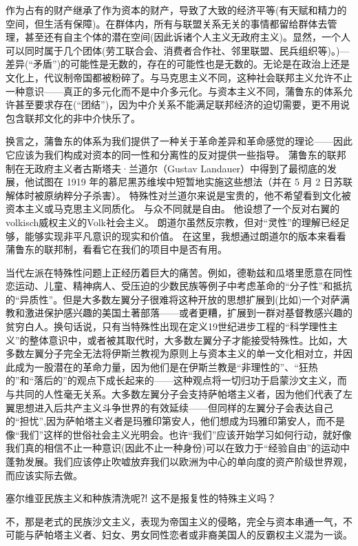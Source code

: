 \documentclass[DIV=12,%
               BCOR=0mm,%
               headinclude=false,%
               footinclude=false,open=any,%
               fontsize=10pt,%
               oneside,%
               paper=210mm:11in]%
               {scrbook}
\begin{document}
作为占有的财产继承了作为资本的财产，导致了大致的经济平等(有天赋和精力的空间，但生活有保障)。在群体内，所有与联盟关系无关的事情都留给群体去管理，甚至还有自主个体的潜在空间(因此诉诸个人主义无政府主义)。显然，一个人可以同时属于几个团体(劳工联合会、消费者合作社、邻里联盟、民兵组织等)。)—差异(“矛盾”)的可能性是无数的，存在的可能性也是无数的。无论是在政治上还是文化上，代议制帝国都被粉碎了。与马克思主义不同，这种社会联邦主义允许不止一种意识——真正的多元化而不是中介多元化。与资本主义不同，蒲鲁东的体系允许甚至要求存在(“团结”)，因为中介关系不能满足联邦经济的迫切需要，更不用说包含联邦文化的非中介快乐了。


换言之，蒲鲁东的体系为我们提供了一种关于革命差异和革命感觉的理论——因此它应该为我们构成对资本的同一性和分离性的反对提供一些指导。 蒲鲁东的联邦制在无政府主义者古斯塔夫·兰道尔（Gustav Landauer）中得到了最彻底的发展，他试图在 1919 年的慕尼黑苏维埃中短暂地实施这些想法（并在 5 月 2 日苏联解体时被原纳粹分子杀害）。 特殊性对兰道尔来说是宝贵的，他不希望看到文化被资本主义或马克思主义同质化。 与众不同就是自由。 他设想了一个反对右翼的volkisch威权主义的Volk社会主义。 朗道尔虽然反宗教，但对“灵性”的理解已经足够，能够实现非平凡意识的现实和价值。 在这里，我想通过朗道尔的版本来看看蒲鲁东的联邦制，看看它在我们的项目中是否有用。


当代左派在特殊性问题上正经历着巨大的痛苦。例如，德勒兹和瓜塔里愿意在同性恋运动、儿童、精神病人、受压迫的少数民族等例子中考虑革命的“分子性”和抵抗的“异质性”。但是大多数左翼分子很难将这种开放的思想扩展到(比如)一个对萨满教和激进保护感兴趣的美国土著部落——或者更糟，扩展到一群对基督教感兴趣的贫穷白人。换句话说，只有当特殊性出现在定义19世纪进步工程的“科学理性主义”的整体意识中，或者被其取代时，大多数左翼分子才能接受特殊性。比如，大多数左翼分子完全无法将伊斯兰教视为原则上与资本主义的单一文化相对立，并因此成为一股潜在的革命力量，因为他们是在伊斯兰教是“非理性的”、“狂热的”和“落后的”的观点下成长起来的——这种观点将一切归功于启蒙沙文主义，而与共同的人性毫无关系。大多数左翼分子会支持萨帕塔主义者，因为他们代表了左翼思想进入后共产主义斗争世界的有效延续——但同样的左翼分子会表达自己的“担忧”,因为萨帕塔主义者是玛雅印第安人，他们想成为玛雅印第安人，而不是像“我们”这样的世俗社会主义光明会。也许“我们”应该开始学习如何行动，就好像我们真的相信不止一种意识(因此不止一种身份)可以在致力于“经验自由”的运动中蓬勃发展。我们应该停止吹嘘放弃我们以欧洲为中心的单向度的资产阶级世界观，而应该实际去做。


塞尔维亚民族主义和种族清洗呢⁈ 这不是报复性的特殊主义吗？


不，那是老式的民族沙文主义，表现为帝国主义的侵略，完全与资本串通一气，不可能与萨帕塔主义者、妇女、男女同性恋者或非裔美国人的反霸权主义混为一谈。
\end{document}
